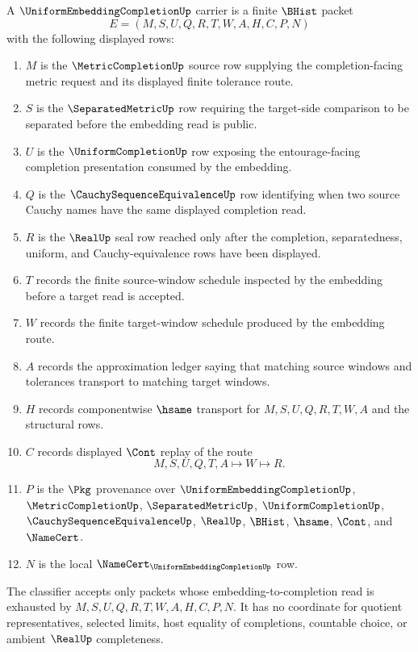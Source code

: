 \begin{definition}
\label{def:uniform-embedding-completion-carrier}
A $\UniformEmbeddingCompletionUp$ carrier is a finite $\BHist$ packet
$$
E=(M,S,U,Q,R,T,W,A,H,C,P,N)
$$
with the following displayed rows:
\begin{enumerate}
\item $M$ is the $\MetricCompletionUp$ source row supplying the completion-facing metric request and its displayed finite tolerance route.
\item $S$ is the $\SeparatedMetricUp$ row requiring the target-side comparison to be separated before the embedding read is public.
\item $U$ is the $\UniformCompletionUp$ row exposing the entourage-facing completion presentation consumed by the embedding.
\item $Q$ is the $\CauchySequenceEquivalenceUp$ row identifying when two source Cauchy names have the same displayed completion read.
\item $R$ is the $\RealUp$ seal row reached only after the completion, separatedness, uniform, and Cauchy-equivalence rows have been displayed.
\item $T$ records the finite source-window schedule inspected by the embedding before a target read is accepted.
\item $W$ records the finite target-window schedule produced by the embedding route.
\item $A$ records the approximation ledger saying that matching source windows and tolerances transport to matching target windows.
\item $H$ records componentwise $\hsame$ transport for $M,S,U,Q,R,T,W,A$ and the structural rows.
\item $C$ records displayed $\Cont$ replay of the route
$$
M,S,U,Q,T,A \longmapsto W \longmapsto R .
$$
\item $P$ is the $\Pkg$ provenance over $\UniformEmbeddingCompletionUp$, $\MetricCompletionUp$, $\SeparatedMetricUp$, $\UniformCompletionUp$, $\CauchySequenceEquivalenceUp$, $\RealUp$, $\BHist$, $\hsame$, $\Cont$, and $\NameCert$.
\item $N$ is the local $\NameCert_{\UniformEmbeddingCompletionUp}$ row.
\end{enumerate}
The classifier accepts only packets whose embedding-to-completion read is exhausted by $M,S,U,Q,R,T,W,A,H,C,P,N$. It has no coordinate for quotient representatives, selected limits, host equality of completions, countable choice, or ambient $\RealUp$ completeness.
\end{definition}

